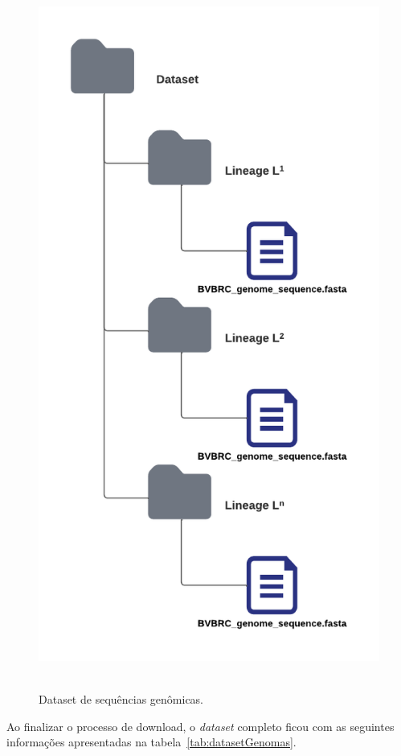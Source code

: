 \begin{figure}[htb]
  \centering
  \caption{Dataset de sequências genômicas.}
  \includegraphics[scale=0.5]{figuras/dataset_principal.pdf}
  ~\label{fig:datasetGenomas}
\end{figure}

Ao finalizar o processo de download, o \textit{dataset} completo ficou com as seguintes informações apresentadas na tabela~\ref{tab:datasetGenomas}.

